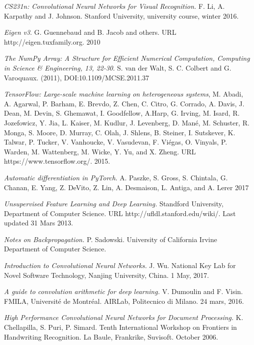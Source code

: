 \documentclass[a4paper,11pt,twoside]{article}
\begin{document}
\begin{thebibliography}{99}	
	\textit{CS231n: Convolutional Neural Networks for Visual Recognition.}
    F. Li, A. Karpathy and J. Johnson.
	Stanford University, university course, winter 2016.
	

\textit{Eigen v3}.
G. Guennebaud and B. Jacob and others. URL http://eigen.tuxfamily.org. 2010

\textit{The NumPy Array: A Structure for Efficient Numerical Computation, Computing in Science \& Engineering, 13, 22-30}.
S. van der Walt, S. C. Colbert and G. Varoquaux.  (2011), DOI:10.1109/MCSE.2011.37 

 

\textit{TensorFlow: Large-scale machine learning on heterogeneous systems},
M. Abadi, A. Agarwal, P. Barham, E. Brevdo,
Z. Chen, C. Citro, G. Corrado, A. Davis,
J. Dean, M. Devin, S. Ghemawat, I. Goodfellow,
A.Harp, G. Irving, M. Isard, R. Jozefowicz, Y. Jia,
L. Kaiser, M. Kudlur, J. Levenberg, D. Mané, M. Schuster,
R. Monga, S. Moore, D. Murray, C. Olah, J. Shlens,
B. Steiner, I. Sutskever, K. Talwar, P. Tucker,
V. Vanhoucke, V. Vasudevan, F. Viégas,
O. Vinyals, P. Warden, M. Wattenberg, M. Wicke,
Y. Yu, and X. Zheng.
URL https://www.tensorflow.org/.
2015.

\textit{Automatic differentiation in PyTorch}.
A. Paszke,   S. Gross, S. Chintala,   G. Chanan,   E. Yang,   Z. DeVito,   Z. Lin,   A. Desmaison,   L. Antiga,  and A. Lerer
2017


	
	\textit{Unsupervised Feature Learning and Deep Learning.}
    Standford University, Department of Computer Science.
    URL http://ufldl.stanford.edu/wiki/.
	Last updated 31 Mars 2013.	
	
	\textit{Notes on Backpropagation.}
    P. Sadowski.
    University of California Irvine	Department of Computer Science.
    
	\textit{Introduction to Convolutional Neural Networks.}
    J. Wu. 
    National Key Lab for Novel Software Technology, Nanjing University, China.
    1 May, 2017.

	\textit{A guide to convolution arithmetic for deep learning.}
    V. Dumoulin  and F. Visin.
    FMILA, Université de Montréal. AIRLab, Politecnico di Milano.
	24 mars, 2016.

	\textit{High Performance Convolutional Neural Networks for Document Processing.}
    K. Chellapilla, S. Puri, P. Simard.
    Tenth International Workshop on Frontiers in Handwriting Recognition. 
    La Baule, Frankrike, Suvisoft.
	October 2006.



\end{thebibliography}
\end{document}
